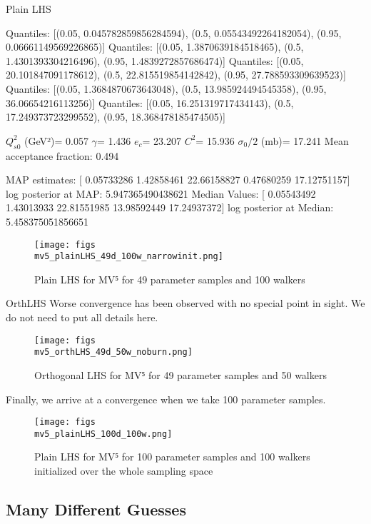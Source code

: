 \documentclass{article}
\begin{document}
Plain LHS 

Quantiles:
[(0.05, 0.045782859856284594), (0.5, 0.05543492264182054), (0.95, 0.06661149569226865)]
Quantiles:
[(0.05, 1.3870639184518465), (0.5, 1.4301393304216496), (0.95, 1.4839272857686474)]
Quantiles:
[(0.05, 20.101847091178612), (0.5, 22.815519854142842), (0.95, 27.788593309639523)]
Quantiles:
[(0.05, 1.3684870673643048), (0.5, 13.985924494545358), (0.95, 36.06654216113256)]
Quantiles:
[(0.05, 16.251319717434143), (0.5, 17.249373723299552), (0.95, 18.368478185474505)]

$Q_{s0}^{2}$ (GeV²)= 0.057
$\gamma$= 1.436
$e_c$= 23.207
$C^{2}$= 15.936
$\sigma_0/2$ (mb)= 17.241
Mean acceptance fraction: 0.494

MAP estimates:  [ 0.05733286  1.42858461 22.66158827  0.47680259 17.12751157]
log posterior at MAP:  5.947365490438621
Median Values:  [ 0.05543492  1.43013933 22.81551985 13.98592449 17.24937372]
log posterior at Median:  5.458375051856651

\begin{figure}
\centering
\texttt{[image: figs\\mv5\_plainLHS\_49d\_100w\_narrowinit.png]}
\caption{Plain LHS for MV⁵ for 49 parameter samples and 100 walkers}
\label{fig:mv5_plainLHS_49d_100w_narrowinit}
\end{figure}

OrthLHS
Worse convergence has been observed with no special point in sight. We do not need to put all details here.

\begin{figure}
\centering
\texttt{[image: figs\\mv5\_orthLHS\_49d\_50w\_noburn.png]}
\caption{Orthogonal LHS for MV⁵ for 49 parameter samples and 50 walkers}
\label{fig:mv5_orthLHS_49d_50w_noburn}
\end{figure}

Finally, we arrive at a convergence when we take 100 parameter samples. 

\begin{figure}
    \centering
    \texttt{[image: figs\\mv5\_plainLHS\_100d\_100w.png]}
    \caption{Plain LHS for MV⁵ for 100 parameter samples and 100 walkers initialized over the whole sampling space}
    \label{fig:mv5_plainLHS_100d_100w}
    \end{figure}

\subsection{Many Different Guesses}
\end{document}
